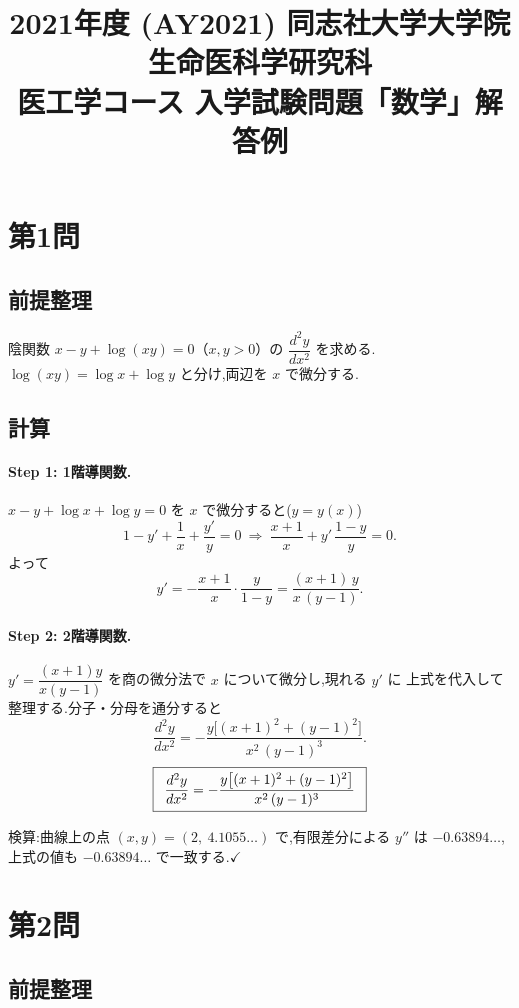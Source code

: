 \documentclass[11pt,a4paper]{article}
\title{2021年度 (AY2021) 同志社大学大学院 生命医科学研究科\\
医工学コース 入学試験問題「数学」解答例}
\author{}
\date{}
\begin{document}
\maketitle
\vspace{-3em}

\section*{第1問}

\subsection*{前提整理}

陰関数 $x-y+\log(xy)=0$（$x,y>0$）の $\dfrac{d^2y}{dx^2}$ を求める.
$\log(xy)=\log x+\log y$ と分け,両辺を $x$ で微分する.

\subsection*{計算}

\paragraph{Step 1: 1階導関数.}
$x-y+\log x+\log y=0$ を $x$ で微分すると($y=y(x)$)
\[
1-y'+\frac1x+\frac{y'}{y}=0
\ \Longrightarrow\
\frac{x+1}{x}+y'\,\frac{1-y}{y}=0.
\]
よって
\[
y'=-\frac{x+1}{x}\cdot\frac{y}{1-y}=\frac{(x+1)\,y}{x\,(y-1)}.
\]

\paragraph{Step 2: 2階導関数.}
$y'=\dfrac{(x+1)y}{x(y-1)}$ を商の微分法で $x$ について微分し,現れる $y'$ に
上式を代入して整理する.分子・分母を通分すると
\[
\frac{d^2y}{dx^2}
=-\frac{y\bigl[(x+1)^2+(y-1)^2\bigr]}{x^2\,(y-1)^3}.
\]
\[
\ans{\
\frac{d^2y}{dx^2}=-\frac{y\bigl[(x+1)^2+(y-1)^2\bigr]}{x^2\,(y-1)^3}\ }
\]

検算:曲線上の点 $(x,y)=(2,\ 4.1055\ldots)$ で,有限差分による $y''$ は
$-0.63894\ldots$,上式の値も $-0.63894\ldots$ で一致する.$\checkmark$

\section*{第2問}

\subsection*{前提整理}
\end{document}
